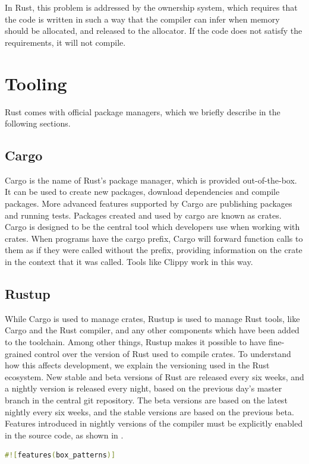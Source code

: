 \documentclass[paper=a4,%
  twoside,%
  BCOR4mm,%
  abstract=true,%
  toc=bibliography,%
  chapterprefix=true,%
  toc=bibliographynumbered,%
  open=right,%
  english,%
  pagesize=pdftex]{scrreprt}
\begin{document}
In Rust, this problem is addressed by the ownership system, which requires that the code is written in such a way that the compiler can infer when memory should be allocated, and released to the allocator. If the code does not satisfy the requirements, it will not compile.

\section{Tooling}
Rust comes with official package managers, which we briefly describe in the following sections.

\subsection{Cargo}
Cargo is the name of Rust’s package manager, which is provided out-of-the-box. It can be used to create new packages, download dependencies and compile packages. More advanced features supported by Cargo are publishing packages and running tests. Packages created and used by cargo are known as crates. Cargo is designed to be the central tool which developers use when working with crates. When programs have the cargo prefix, Cargo will forward function calls to them as if they were called without the prefix, providing information on the crate in the context that it was called. Tools like Clippy work in this way.

\subsection{Rustup}
While Cargo is used to manage crates, Rustup is used to manage Rust tools, like Cargo and the Rust compiler, and any other components which have been added to the toolchain. Among other things, Rustup makes it possible to have fine-grained control over the version of Rust used to compile crates. To understand how this affects development, we explain the versioning used in the Rust ecosystem. New stable and beta versions of Rust are released every six weeks, and a nightly version is released every night, based on the previous day's master branch in the central git repository. The beta versions are based on the latest nightly every six weeks, and the stable versions are based on the previous beta.
Features introduced in nightly versions of the compiler must be explicitly enabled in the source code, as shown in .

\begin{lstlisting}[language=Rust, style=boxed, caption=Enabling features in Rust, label=lst:example-enable-feature]
#![features(box_patterns)]
\end{lstlisting}
\end{document}
